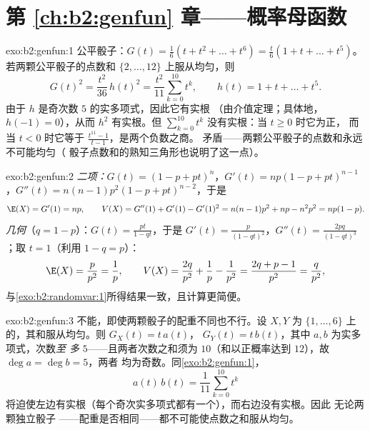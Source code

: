 \section*{第 \ref{ch:b2:genfun} 章——概率母函数}

\begin{solution}{exo:b2:genfun:1}
公平骰子：$G(t) = \frac16(t + t^2 + \dots + t^6) = \frac t6(1 + t
+ \dots + t^5)$。若两颗公平骰子的点数和
$\{2, \dots, 12\}$ 上服从均匀，则
\[
G(t)^2 = \frac{t^2}{36}\,h(t)^2
= \frac{t^2}{11}\sum_{k=0}^{10}t^k ,
\qquad h(t) = 1 + t + \dots + t^5 .
\]
由于 $h$ 是奇次数 $5$ 的实多项式，因此它有实根
（由介值定理；具体地，$h(-1) = 0$），从而
$h^2$ 有实根。但 $\sum_{k=0}^{10}t^k$ 没有实根：当 $t \geq 0$ 时它为正，
而当 $t < 0$ 时它等于
$\frac{t^{11} - 1}{t - 1}$，是两个负数之商。
矛盾——两颗公平骰子的点数和永远不可能均匀（
骰子点数和的熟知三角形也说明了这一点）。
\end{solution}

\begin{solution}{exo:b2:genfun:2}
\emph{二项：}$G(t) = (1 - p + pt)^n$，$G'(t) = np(1 - p +
pt)^{n-1}$，$G''(t) = n(n-1)p^2(1 - p + pt)^{n-2}$，于是
\[
\E(X) = G'(1) = np,
\qquad
V(X) = G''(1) + G'(1) - G'(1)^2
= n(n-1)p^2 + np - n^2p^2 = np(1-p).
\]
\emph{几何}（$q = 1 - p$）：$G(t) = \frac{pt}{1 - qt}$，于是
$G'(t) = \frac{p}{(1 - qt)^2}$，$G''(t) = \frac{2pq}{(1 -
qt)^3}$；取 $t = 1$（利用 $1 - q = p$）：
\[
\E(X) = \frac{p}{p^2} = \frac1p,
\qquad
V(X) = \frac{2q}{p^2} + \frac1p - \frac{1}{p^2}
= \frac{2q + p - 1}{p^2}
= \frac{q}{p^2} ,
\]
与\cref{exo:b2:randomvar:1}所得结果一致，且计算更简便。
\end{solution}

\begin{solution}{exo:b2:genfun:3}
不能，即使两颗骰子的配重不同也不行。设 $X, Y$ 为
$\{1, \dots, 6\}$ 上的，其和服从均匀。则 $G_X(t) = t\,a(t)$，
$G_Y(t) = t\,b(t)$，其中 $a, b$ 为实多项式，次数\emph{至
多} $5$——且两者次数之和须为 $10$（和以正概率达到
$12$），故 $\deg a = \deg b = 5$，两者
均为奇数。同\cref{exo:b2:genfun:1}，
\[
a(t)\,b(t) = \frac{1}{11}\sum_{k=0}^{10}t^k
\]
将迫使左边有实根（每个奇次实多项式都有一个），而右边没有实根。因此
无论两颗独立骰子
——配重是否相同——都不可能使点数之和服从均匀。
\end{solution}

